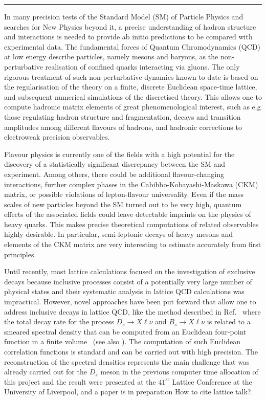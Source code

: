 \rule{\textwidth}{0.4pt}

In many precision tests of the Standard Model (SM) of Particle Physics and
searches for New Physics beyond it, a precise understanding of hadron
structure and interactions is needed to provide ab initio predictions
to be compared with experimental data. The fundamental forces of Quantum
Chromodynamics (QCD) at low energy describe particles, namely mesons and
baryons, as the non-perturbative realisation of confined quarks interacting
via gluons. The only rigorous treatment of such non-perturbative
dynamics known to date is based on the regularisation of the theory on
a finite, discrete Euclidean space-time lattice, and subsequent
numerical simulations of the discretised theory. This allows one to
compute hadronic matrix elements of great phenomenological interest,
such as e.g those regulating hadron structure and fragmentation, decays and transition
amplitudes among different flavours of hadrons, and hadronic corrections
to electroweak precision observables.

Flavour physics is currently one of the fields with a high potential
for the discovery of a statistically significant discrepancy between the SM and
experiment. Among others, there could be additional flavour-changing
interactions, further complex phases in the Cabibbo-Kobayashi-Maskawa (CKM)
matrix, or possible violations
of lepton-flavour universality. Even if the mass scales of new
particles beyond the SM turned out to be very high, quantum effects of
the associated fields could leave detectable imprints on the physics
of heavy quarks.
This makes precise theoretical computations of related observables
highly desirable. In particular, semi-leptonic decays of heavy mesons
and elements of the CKM matrix are very
interesting to estimate accurately from first principles.

Until recently, most lattice calculations focused on the investigation
of exclusive decays because inclusive processes consist
of a potentially very large number of physical states and their
systematic analysis in lattice QCD calculations was impractical.
However, novel approaches have been put forward that allow one to address
inclusive decays in lattice QCD, like the method described in
Ref.~\cite{Gambino:2020crt} where the total decay rate for the process
$D_s \to X\ell\nu$ and $B_s \to X\ell\nu$   is related to a smeared spectral
density that can be computed from an Euclidean four-point function in a finite
volume~\cite{Hansen:2019idp} (see
also \cite{Bulava:2019kbi,Bulava:2021fre,Gambino:2022dvu}). The computation of such
Euclidean correlation functions is standard and can be carried out
with high precision.
The reconstruction of the spectral densities
represents the main challenge that was already carried out for the $D_s$ meson
in the previous computer time allocation of this project and the result were
presented at the $41^{\mbox{st}}$ Lattice Conference at the University of Liverpool,
and a paper is in preparation {\color{red} How to cite lattice talk?}.

